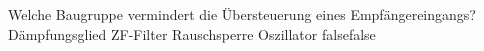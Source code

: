     {Welche Baugruppe vermindert die Übersteuerung eines Empfängereingangs?}
    {Dämpfungsglied}
    {ZF-Filter}
    {Rauschsperre}
    {Oszillator}
    {false}{false}